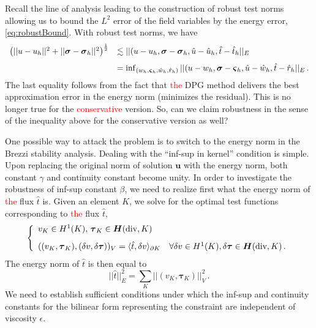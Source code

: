 \documentclass[letterpaper]{article}
\def\bftau{\boldsymbol\tau}
\def\bfvarsigma{\boldsymbol\varsigma}
\newcommand{\LRp}[1]{\left( #1 \right)}
\newcommand{\ptl}{{\partial}}
\newcommand{\bfsig}{\mbox{\boldmath $\sigma$}}
\newcommand{\bfu}{\boldsymbol u}
\newcommand{\bfH}{\mbox{\boldmath $H$}}
\newcommand{\red}[1]{\textcolor{red}{#1}}
\begin{document}
Recall the line of analysis leading to the construction of robust
test norms allowing us to bound the $L^2$ error of the field variables by the
energy error, \eqref{eq:robustBound}. With robust test norms, we have
\red{
\begin{equation}
\begin{array}{ll}
   \LRp{|| u - u_h ||^2+ || \bfsig - \bfsig_h ||^2}^{\frac{1}{2}}
& \lesssim || (u - u_h, \bfsig - \bfsig_h, \hat{u} - \hat{u}_h, \hat{t} - \hat{t}_h ||_E \\[8pt]
&= \inf_{(w_h,\bfvarsigma_h,\hat{w}_h,\hat{r}_h)}
|| (u - w_h, \bfsig - \bfvarsigma_h, \hat{u} - \hat{w}_h, \hat{t} - \hat{r}_h ||_E\,.
\end{array}
\end{equation}
}
The last equality follows from the fact that \red{the} DPG method delivers the best approximation
error in the energy norm (minimizes the residual). This is no longer true for the
\red{conservative} version. So, can we claim robustness in the sense of the inequality above
for the conservative version as well?

One possible way to attack the problem is to switch to the energy norm in the Brezzi stability
analysis. Dealing with the ``inf-sup in kernel'' condition is simple. Upon replacing
the original norm of solution $\bfu$ with the energy norm, both constant $\gamma$ and continuity
constant become unity. In order to investigate the robustness of inf-sup  constant $\beta$,
we need to realize first what the energy norm of \red{the} flux $\hat{t}$ is. Given an element $K$,
we solve for the optimal test functions corresponding to \red{the} flux $\hat{t}$,
\begin{equation}
\left\{
\begin{array}{ll}
v_K \in H^1(K),\, \bftau_K \in \bfH(\text{div},K)\\[8pt]
((v_K,\bftau_K), (\delta v,\delta \bftau))_V = \langle \hat{t},\delta v\rangle_{\ptl K}
\quad \forall \delta v \in H^1(K), \delta \bftau \in \bfH(\text{div},K)\,.
\end{array}
\right.
\label{eq:local_problem}
\end{equation}
The energy norm of $\hat{t}$ is then equal to
\begin{equation}
|| \hat{t} ||_E^2 = \sum_K || (v_K,\bftau_K) ||_V^2\,.
\end{equation}
We need to establish sufficient conditions under which the inf-sup and continuity constants for
the bilinear form representing the constraint are independent of viscosity $\epsilon$.
\end{document}
